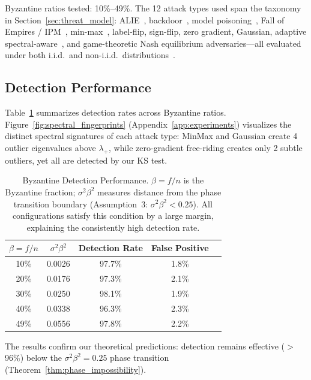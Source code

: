 Byzantine ratios tested: 10\%--49\%.
The 12 attack types used span the taxonomy in Section~\ref{sec:threat_model}:
ALIE~\cite{alie_attack}, backdoor~\cite{backdoor_fl}, model poisoning~\cite{fl_poisoning},
Fall of Empires / IPM~\cite{fall_of_empires},
min-max~\cite{minmax_attack}, label-flip, sign-flip, zero gradient, Gaussian, adaptive spectral-aware~\cite{adaptive_aggregation},
and game-theoretic Nash equilibrium adversaries---all evaluated under both i.i.d.\ and non-i.i.d.\ distributions~\cite{non_iid}.

\subsection{Detection Performance}

Table~\ref{tab:detection_results} summarizes detection rates across Byzantine ratios.
Figure~\ref{fig:spectral_fingerprints} (Appendix~\ref{app:experiments}) visualizes the
distinct spectral signatures of each attack type: MinMax and Gaussian create 4 outlier
eigenvalues above $\lambda_+$, while zero-gradient free-riding creates only 2 subtle
outliers, yet all are detected by our KS test.

\begin{table}[htbp]
\centering
\caption{Byzantine Detection Performance. $\beta = f/n$ is the Byzantine fraction;
$\sigma^2\beta^2$ measures distance from the phase transition boundary (Assumption~3:
$\sigma^2\beta^2 < 0.25$). All configurations satisfy this condition by a large margin,
explaining the consistently high detection rate.}
\label{tab:detection_results}
\begin{tabular}{|c|c|c|c|c|}
\hline
\textbf{$\beta = f/n$} & \textbf{$\sigma^2\beta^2$} & \textbf{Detection Rate} & \textbf{False Positive} \\
\hline
10\% & 0.0026 & 97.7\% & 1.8\% \\
20\% & 0.0176 & 97.3\% & 2.1\% \\
30\% & 0.0250 & 98.1\% & 1.9\% \\
40\% & 0.0338 & 96.3\% & 2.3\% \\
49\% & 0.0556 & 97.8\% & 2.2\% \\
\hline
\end{tabular}
\end{table}

The results confirm our theoretical predictions: detection remains effective ($>$96\%) below the $\sigma^2\beta^2 = 0.25$ phase transition (Theorem~\ref{thm:phase_impossibility}).

